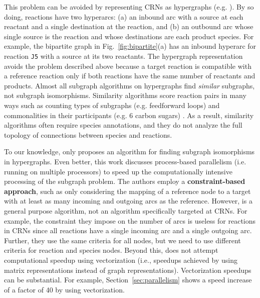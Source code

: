 \documentclass[webpdf,contemporary,large]{oup-authoring-template}
\newcommand{\fig}[1]{
  Fig.~\ref{#1}}
\newcommand{\secref}[1]{Section~\ref{#1}}
\theoremstyle{thmstyleone}%
\theoremstyle{thmstyletwo}%
\theoremstyle{thmstylethree}%
\begin{document}
 This problem can be avoided by representing CRNs as hypergraphs (e.g. \citep{yang_hgmatch_2023}). By so doing, reactions have two hyperarcs: (a) an inbound arc with a source at each reactant and a single destination at the reaction, and (b) an outbound arc whose single source is the reaction and whose destinations are each product species.
 For example, the bipartite graph in \fig{fig:bipartite}(a)
 has an inbound hyperarc for reaction \texttt{J5}
 with a source at its two reactants.
 The hypergraph representation avoids the problem described above because a target reaction is compatible with a reference reaction only if both reactions have the same number of reactants and products. 
 Almost all subgraph algorithms on hypergraphs find {\em similar} subgraphs, not subgraph isomorphisms. Similarity algorithms score reaction pairs in many ways such as counting types of subgraphs (e.g. feedforward loops) and commonalities in their participants (e.g. 6 carbon sugars)
\citep{zhang_h2mn_2021, sharan_modeling_2006, milano_challenges_2022}.
As a result, similarity algorithms often require species annotations, and they do not analyze the full topology of connections between species and reactions.


To our knowledge, only \citep{yang_hgmatch_2023} proposes an algorithm for finding subgraph isomorphisms in hypergraphs.
 Even better, this work discusses process-based parallelism (i.e. running on multiple processors) to speed up the computationally intensive processing of the subgraph problem.
 The authors employ a {\bf constraint-based approach}, such as only considering the mapping of a reference node to a target with at least as many incoming and outgoing arcs as the reference.
 However, \citep{yang_hgmatch_2023} is a general purpose algorithm, not an algorithm specifically targeted at CRNs. For example, the constraint they impose on the number of arcs is useless for reactions in CRNs since all reactions have a single incoming arc and a single outgoing arc.
 Further, they use  the same criteria for all nodes, but we need to use different criteria for reaction and species nodes.
 Beyond this, \citep{yang_hgmatch_2023} does not attempt computational speedup using vectorization (i.e., speedups achieved by using matrix representations instead of graph representations).
 Vectorization speedups can be substantial.
 For example, \secref{sec:parallelism} shows a speed increase of a factor of 40 by using vectorization.
\end{document}
